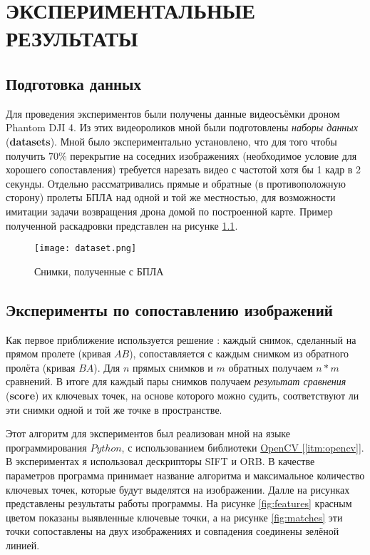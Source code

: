 \chapter{ЭКСПЕРИМЕНТАЛЬНЫЕ РЕЗУЛЬТАТЫ}

\section{Подготовка данных}

Для проведения экспериментов были получены данные видеосъёмки дроном Phantom DJI 4. Из этих видеороликов мной были подготовлены \textit{наборы данных} (\textbf{datasets}). Мной было экспериментально установлено, что для того чтобы получить $70\%$ перекрытие на соседних изображениях (необходимое условие для хорошего сопоставления) требуется нарезать видео с частотой хотя бы 1 кадр в 2 секунды. Отдельно рассматривались прямые и обратные (в противоположную сторону) пролеты БПЛА над одной и той же местностью, для возможности имитации задачи возвращения дрона домой по построенной карте. Пример полученной раскадровки представлен на рисунке \ref{fig:dataset}.

\begin{figure}[h]
    \centering
    \texttt{[image: dataset.png]}
    \caption{Снимки, полученные с БПЛА}
    \label{fig:dataset}
\end{figure}

\section{Эксперименты по сопоставлению изображений}

Как первое приближение используется решение : каждый снимок, сделанный на прямом пролете (кривая $AB$), сопоставляется с каждым снимком из обратного пролёта (кривая $BA$). Для $n$ прямых снимков и $m$ обратных получаем $n*m$ сравнений. В итоге для каждый пары снимков получаем \textit{результат сравнения} (\textbf{score}) их ключевых точек, на основе которого можно судить, соответствуют ли эти снимки одной и той же точке в пространстве.

Этот алгоритм для экспериментов был реализован мной на языке программирования $Python$, с использованием библиотеки \hyperref[itm:opencv]{OpenCV [\ref{itm:opencv}]}. В экспериментах я использовал дескрипторы SIFT и ORB. В качестве параметров программа принимает название алгоритма и максимальное количество ключевых точек, которые будут выделятся на изображении. Далле на рисунках представлены результаты работы программы. На рисунке \ref{fig:features} красным цветом показаны выявленные ключевые точки, а на рисунке \ref{fig:matches} эти точки сопоставлены на двух изображениях и совпадения соединены зелёной линией.

